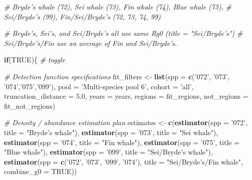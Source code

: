 \documentclass[
]{book}
\newenvironment{Shaded}{\begin{snugshade}}{\end{snugshade}}
\newcommand{\CommentTok}[1]{\textcolor[rgb]{0.56,0.35,0.01}{\textit{#1}}}
\newcommand{\ControlFlowTok}[1]{\textcolor[rgb]{0.13,0.29,0.53}{\textbf{#1}}}
\newcommand{\DataTypeTok}[1]{\textcolor[rgb]{0.13,0.29,0.53}{#1}}
\newcommand{\FloatTok}[1]{\textcolor[rgb]{0.00,0.00,0.81}{#1}}
\newcommand{\KeywordTok}[1]{\textcolor[rgb]{0.13,0.29,0.53}{\textbf{#1}}}
\newcommand{\NormalTok}[1]{#1}
\newcommand{\OtherTok}[1]{\textcolor[rgb]{0.56,0.35,0.01}{#1}}
\newcommand{\StringTok}[1]{\textcolor[rgb]{0.31,0.60,0.02}{#1}}
\begin{document}
\begin{Shaded}
\begin{Highlighting}[]
\CommentTok{# Bryde's whale (72), Sei whale (73), Fin whale (74), Blue whale (75),}
\CommentTok{# Sei/Bryde's (99), Fin/Sei/Bryde's (72, 73, 74, 99)}

\CommentTok{# Bryde's, Sei's, and Sei/Bryde's all use same Rg0 (title = "Sei/Bryde's")}
\CommentTok{# Sei/Bryde's/Fin use an average of Fin and Sei/Bryde's.}

\ControlFlowTok{if}\NormalTok{(}\OtherTok{TRUE}\NormalTok{)\{ }\CommentTok{# toggle}

  \CommentTok{# Detection function specifications}
\NormalTok{  fit_filters <-}
\StringTok{    }\KeywordTok{list}\NormalTok{(}\DataTypeTok{spp =} \KeywordTok{c}\NormalTok{(}\StringTok{'072'}\NormalTok{, }\StringTok{'073'}\NormalTok{, }\StringTok{'074'}\NormalTok{,}\StringTok{'075'}\NormalTok{,}\StringTok{'099'}\NormalTok{),}
         \DataTypeTok{pool =} \StringTok{'Multi-species pool 6'}\NormalTok{,}
         \DataTypeTok{cohort =} \StringTok{'all'}\NormalTok{,}
         \DataTypeTok{truncation_distance =} \FloatTok{5.0}\NormalTok{,}
         \DataTypeTok{years =}\NormalTok{ years,}
         \DataTypeTok{regions =}\NormalTok{ fit_regions,}
         \DataTypeTok{not_regions =}\NormalTok{ fit_not_regions)}

  \CommentTok{# Density / abundance estimation plan}
\NormalTok{   estimates <-}
\StringTok{      }\KeywordTok{c}\NormalTok{(}\KeywordTok{estimator}\NormalTok{(}\DataTypeTok{spp =} \StringTok{'072'}\NormalTok{, }\DataTypeTok{title =} \StringTok{"Bryde's whale"}\NormalTok{),}
        \KeywordTok{estimator}\NormalTok{(}\DataTypeTok{spp =} \StringTok{'073'}\NormalTok{, }\DataTypeTok{title =} \StringTok{"Sei whale"}\NormalTok{),}
        \KeywordTok{estimator}\NormalTok{(}\DataTypeTok{spp =} \StringTok{'074'}\NormalTok{, }\DataTypeTok{title =} \StringTok{"Fin whale"}\NormalTok{),}
        \KeywordTok{estimator}\NormalTok{(}\DataTypeTok{spp =} \StringTok{'075'}\NormalTok{, }\DataTypeTok{title =} \StringTok{"Blue whale"}\NormalTok{),}
        \KeywordTok{estimator}\NormalTok{(}\DataTypeTok{spp =} \StringTok{'099'}\NormalTok{, }\DataTypeTok{title =} \StringTok{"Sei/Bryde's whale"}\NormalTok{),}
        \KeywordTok{estimator}\NormalTok{(}\DataTypeTok{spp =} \KeywordTok{c}\NormalTok{(}\StringTok{'072'}\NormalTok{, }\StringTok{'073'}\NormalTok{, }\StringTok{'099'}\NormalTok{, }\StringTok{'074'}\NormalTok{), }
                  \DataTypeTok{title =} \StringTok{"Sei/Bryde's/Fin whale"}\NormalTok{,}
                  \DataTypeTok{combine_g0 =} \OtherTok{TRUE}\NormalTok{))}
  

\end{Highlighting}
\end{Shaded}
\end{document}
